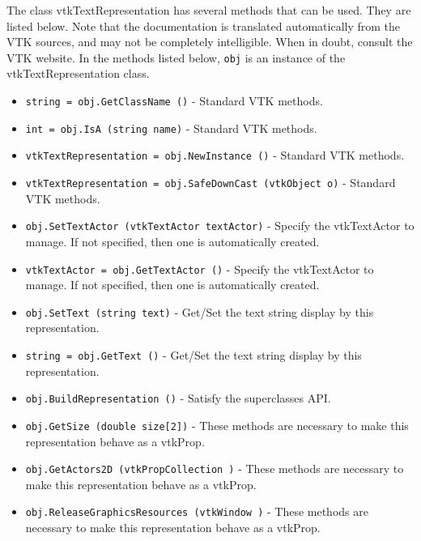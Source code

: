The class vtkTextRepresentation has several methods that can be used.
  They are listed below.
Note that the documentation is translated automatically from the VTK sources,
and may not be completely intelligible.  When in doubt, consult the VTK website.
In the methods listed below, \verb|obj| is an instance of the vtkTextRepresentation class.
\begin{itemize}
\item  \verb|string = obj.GetClassName ()| -  Standard VTK methods.

\item  \verb|int = obj.IsA (string name)| -  Standard VTK methods.

\item  \verb|vtkTextRepresentation = obj.NewInstance ()| -  Standard VTK methods.

\item  \verb|vtkTextRepresentation = obj.SafeDownCast (vtkObject o)| -  Standard VTK methods.

\item  \verb|obj.SetTextActor (vtkTextActor textActor)| -  Specify the vtkTextActor to manage. If not specified, then one
 is automatically created.

\item  \verb|vtkTextActor = obj.GetTextActor ()| -  Specify the vtkTextActor to manage. If not specified, then one
 is automatically created.

\item  \verb|obj.SetText (string text)| -  Get/Set the text string display by this representation.

\item  \verb|string = obj.GetText ()| -  Get/Set the text string display by this representation.

\item  \verb|obj.BuildRepresentation ()| -  Satisfy the superclasses API.

\item  \verb|obj.GetSize (double size[2])| -  These methods are necessary to make this representation behave as
 a vtkProp.

\item  \verb|obj.GetActors2D (vtkPropCollection )| -  These methods are necessary to make this representation behave as
 a vtkProp.

\item  \verb|obj.ReleaseGraphicsResources (vtkWindow )| -  These methods are necessary to make this representation behave as
 a vtkProp.


\end{itemize}
